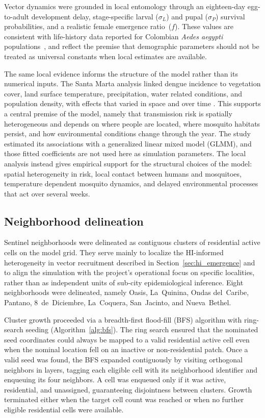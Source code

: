 \documentclass[applsci,article,accept,pdftex,moreauthors]{Definitions/mdpi}
\begin{document}
Vector dynamics were grounded in local entomology through an eighteen-day egg-to-adult development delay, stage-specific larval ($\sigma_L$) and pupal ($\sigma_P$) survival probabilities, and a realistic female emergence ratio~($f$). These values are consistent with life-history data reported for Colombian \textit{Aedes aegypti} populations~\cite{ArevaloCortes2022InsectsColombiaAedes}, and reflect the premise that demographic parameters should not be treated as universal constants when local estimates are available.

The same local evidence informs the structure of the model rather than its numerical inputs. The Santa Marta analysis linked dengue incidence to vegetation cover, land surface temperature, precipitation, water related conditions, and population density, with effects that varied in space and over time \cite{MARTIN2026100164}. This supports a central premise of the model, namely that transmission risk is spatially heterogeneous and depends on where people are located, where mosquito habitats persist, and how environmental conditions change through the year. The study estimated its associations with a generalized linear mixed model (GLMM), and those fitted coefficients are not used here as simulation parameters. The local analysis instead gives empirical support for the structural choices of the model: spatial heterogeneity in risk, local contact between humans and mosquitoes, temperature dependent mosquito dynamics, and delayed environmental processes that act over several weeks.

\subsection{Neighborhood delineation}
\label{sec:neighborhoods}

Sentinel neighborhoods were delineated as contiguous clusters of residential active cells on the model grid. They serve mainly to localize the HI-informed heterogeneity in vector recruitment described in Section~\ref{sec:hi_emergence} and to align the simulation with the project's operational focus on specific localities, rather than as independent units of sub-city epidemiological inference. Eight neighborhoods were delineated, namely Oasis, La~Quinina, Ondas del~Caribe, Pantano, 8~de~Diciembre, La~Coquera, San~Jacinto, and Nueva~Bethel.

Cluster growth proceeded via a breadth-first flood-fill (BFS) algorithm with ring-search seeding (Algorithm~\ref{alg:bfs}). The ring search ensured that the nominated seed coordinates could always be mapped to a valid residential active cell even when the nominal location fell on an inactive or non-residential patch. Once a valid seed was found, the BFS expanded contiguously by visiting orthogonal neighbors in layers, tagging each eligible cell with its neighborhood identifier and enqueuing its four neighbors. A cell was enqueued only if it was active, residential, and unassigned, guaranteeing disjointness between clusters. Growth terminated either when the target cell count was reached or when no further eligible residential cells were available.
\end{document}
